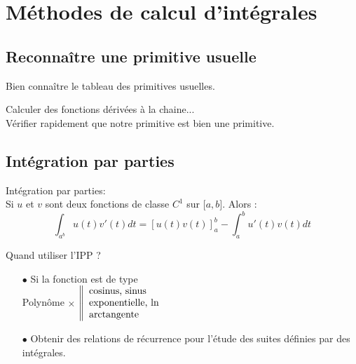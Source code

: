\documentclass[a4paper, 11pt]{article}
\begin{document}
{{{%
\section{M\'ethodes de calcul d'int\'egrales}


\subsection{Reconna\^{i}tre une primitive usuelle}

Bien conna\^{i}tre le tableau des primitives usuelles.\\
\href{http://olivierglorieux.fr/wp-content/uploads/Cours/formulaire_primitives.pdf}{\color{blue}{Voir le  tableau des primitives usuelles}}

Calculer des fonctions dérivées à la chaine... \\
Vérifier rapidement que notre primitive est bien une primitive.

\vsec\vsec\vsec
\subsection{Int\'egration par parties}

{

	\begin{prop} Int\'egration par parties:\\
		Si $u$ et $v$ sont deux fonctions de classe $C^1$ sur $\lbrack a,b\rbrack$. Alors :
		$$\int_{a^b} u(t)v'(t) dt =\left[ u(t)v(t)\right]_a^b-\int_a^b u'(t)v(t)dt$$
	\end{prop}

}
Quand utiliser l'IPP ?
\begin{itemize}
	\item[$\bullet$] Si la fonction est de type\\
	      Polyn\^ome $\times$ $\left\| \begin{array}{l} \hbox{cosinus, sinus}\\ \hbox{exponentielle, ln}\\ \hbox{arctangente}        \end{array} \right.$
	\item[$\bullet$] Obtenir des relations de r\'ecurrence
	      pour l'\'etude des suites d\'efinies par des int\'egrales.
\end{itemize}



}}}
\end{document}

